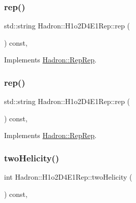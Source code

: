 \subsubsection{\texorpdfstring{rep()}{rep()}\hspace{0.1cm}{\footnotesize\ttfamily [4/5]}}
{\footnotesize\ttfamily std\+::string Hadron\+::\+H1o2\+D4\+E1\+Rep\+::rep (\begin{DoxyParamCaption}{ }\end{DoxyParamCaption}) const\hspace{0.3cm}{\ttfamily [inline]}, {\ttfamily [virtual]}}



Implements \mbox{\hyperlink{structHadron_1_1RepRep_ab3213025f6de249f7095892109575fde}{Hadron\+::\+Rep\+Rep}}.

\mbox{\label{structHadron_1_1H1o2D4E1Rep_a8657044b2491eb10846bc082432edb8e}} 
\subsubsection{\texorpdfstring{rep()}{rep()}\hspace{0.1cm}{\footnotesize\ttfamily [5/5]}}
{\footnotesize\ttfamily std\+::string Hadron\+::\+H1o2\+D4\+E1\+Rep\+::rep (\begin{DoxyParamCaption}{ }\end{DoxyParamCaption}) const\hspace{0.3cm}{\ttfamily [inline]}, {\ttfamily [virtual]}}



Implements \mbox{\hyperlink{structHadron_1_1RepRep_ab3213025f6de249f7095892109575fde}{Hadron\+::\+Rep\+Rep}}.

\mbox{\label{structHadron_1_1H1o2D4E1Rep_aaf66515136803b1657682ffac0d07ce9}} 
\subsubsection{\texorpdfstring{twoHelicity()}{twoHelicity()}\hspace{0.1cm}{\footnotesize\ttfamily [1/3]}}
{\footnotesize\ttfamily int Hadron\+::\+H1o2\+D4\+E1\+Rep\+::two\+Helicity (\begin{DoxyParamCaption}{ }\end{DoxyParamCaption}) const\hspace{0.3cm}{\ttfamily [inline]}, {\ttfamily [virtual]}}

